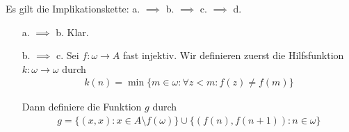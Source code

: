 \begin{solution}

Es gilt die Implikationskette: a. $\implies$ b. $\implies$ c. $\implies$ d.
\begin{itemize}
  \item[a. $\implies$ b.] Klar.
  \item[b. $\implies$ c.] Sei $f: \omega \to A$ fast injektiv.
  Wir definieren zuerst die Hilfsfunktion $k: \omega \to \omega$ durch
  \begin{align*}
    k(n) = \min\{m \in \omega: \forall z < m: f(z) \neq f(m)\}
  \end{align*}

  Dann definiere die Funktion $g$ durch
  \begin{align*}
    g = \{(x,x): x \in A \setminus f(\omega)\} \cup \{(f(n),f(n+1)): n \in \omega\}
  \end{align*}
\end{itemize}

\end{solution}

